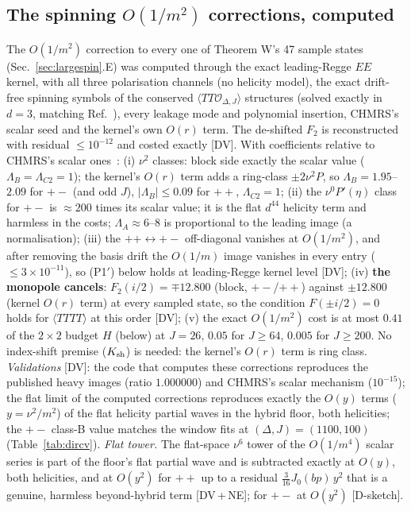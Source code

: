 \documentclass[aps,prl,onecolumn,superscriptaddress,nofootinbib]{revtex4-2}
\begin{document}
\subsection{The spinning $O(1/m^2)$ corrections, computed}
The $O(1/m^2)$ correction to every one of Theorem W's 47 sample states (Sec.~\ref{sec:largespin}.E) was computed through the
exact leading-Regge $EE$ kernel, with all three polarisation channels (no helicity model), the exact drift-free spinning
symbols of the conserved $\langle TT\mathcal O_{\Delta,J}\rangle$ structures (solved exactly in $d=3$, matching
Ref.~\cite{DKKPS}), every leakage mode and polynomial insertion, CHMRS's scalar seed and the kernel's own $O(r)$ term.
The de-shifted $F_2$ is reconstructed with residual $\le10^{-12}$ and costed exactly [DV]. With coefficients relative to
CHMRS's scalar ones~\cite{CHMRS}:
(i) $\nu^2$ classes: block side exactly the scalar value ($\Lambda_B=\Lambda_{C2}=1$); the kernel's $O(r)$ term adds a ring-class
$\pm2\nu^2P$, so $\Lambda_B=1.95$--$2.09$ for $+-$ (and odd $J$), $|\Lambda_B|\le0.09$ for $++$, $\Lambda_{C2}=1$;
(ii) the $\nu^0P'(\eta)$ class for $+-$ is $\approx200$ times its scalar value; it is the flat $d^{44}$ helicity term and
harmless in the costs; $\Lambda_A\approx6$--$8$ is proportional to the leading image (a normalisation);
(iii) the $++\leftrightarrow+-$ off-diagonal vanishes at $O(1/m^2)$, and after removing the basis drift the $O(1/m)$
image vanishes in every entry ($\le3\times10^{-11}$), so (P1$'$) below holds at leading-Regge kernel level [DV];
(iv) \textbf{the monopole cancels}: $F_2(i/2)=\mp12.800$ (block, $+-$/$++$) against $\pm12.800$ (kernel $O(r)$ term) at every
sampled state, so the condition $F(\pm i/2)=0$ holds for $\langle TTTT\rangle$ at this order [DV];
(v) the exact $O(1/m^2)$ cost is at most $0.41$ of the $2\times2$ budget $H$ (below) at $J=26$, $0.05$ for $J\ge64$, $0.005$ for
$J\ge200$. No index-shift premise ($K_{\rm sh}$) is needed: the kernel's $O(r)$ term is ring class.
\emph{Validations} [DV]: the code that computes these corrections reproduces the published heavy images (ratio $1.000000$) and CHMRS's scalar
mechanism ($10^{-15}$); the flat limit of the computed corrections reproduces exactly the $O(y)$ terms ($y=\nu^2/m^2$) of the
flat helicity partial waves in the hybrid floor, both helicities; the $+-$ class-B value matches the window fits at
$(\Delta,J)=(1100,100)$ (Table~\ref{tab:dircv}). \emph{Flat tower.} The flat-space $\nu^6$ tower of the $O(1/m^4)$ scalar
series is part of the floor's flat partial wave and is subtracted exactly at $O(y)$, both helicities, and at $O(y^2)$ for
$++$ up to a residual $\tfrac3{16}J_0(b p)\,y^2$ that is a genuine, harmless beyond-hybrid term [DV\,+\,NE]; for $+-$ at
$O(y^2)$ [D-sketch]. 
\end{document}
